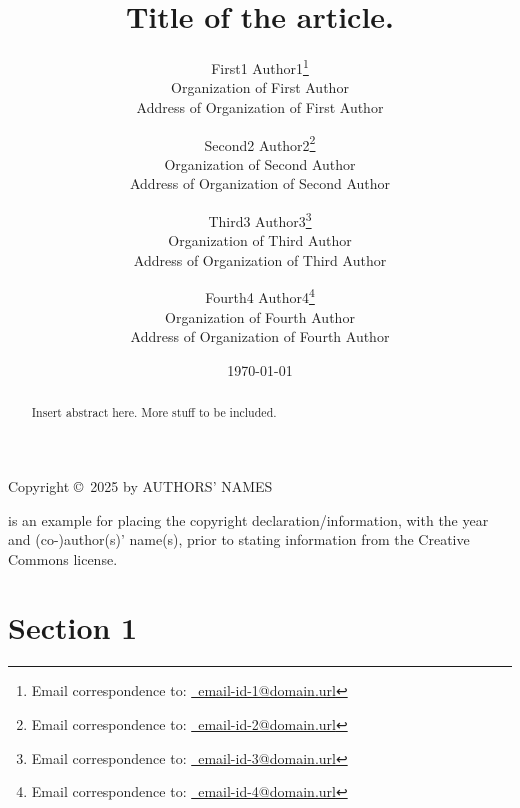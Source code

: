 \documentclass[letter,12pt]{article}
\begin{document}
\title{Title of the article.}
\date{\today}
\author{
	First1 Author1\thanks{Email correspondence to: \href{mailto:email-id-1@domain.url}{\Email\ email-id-1@domain.url}} \\
		Organization of First Author\\
		Address of Organization of First Author
	\and
	Second2 Author2\thanks{Email correspondence to: \href{mailto:email-id-2@domain.url}{\Email\ email-id-2@domain.url}} \\
		Organization of Second Author\\
		Address of Organization of Second Author
	\and
	Third3 Author3\thanks{Email correspondence to: \href{mailto:email-id-3@domain.url}{\Email\ email-id-3@domain.url}} \\
		Organization of Third Author\\
		Address of Organization of Third Author
	\and
	Fourth4 Author4\thanks{Email correspondence to: \href{mailto:email-id-4@domain.url}{\Email\ email-id-4@domain.url}} \\
		Organization of Fourth Author\\
		Address of Organization of Fourth Author
}
\maketitle


\begin{center} 
Copyright \copyright\ 2025 by AUTHORS' NAMES
\end{center}
\doclicenseThis

\cite{Sutton2018} is an example for placing the copyright declaration/information, with the year and (co-)author(s)' name(s), prior to stating information from the Creative Commons license.

\begin{abstract} 
Insert abstract here. More stuff to be included.
\end{abstract}





\section{Section 1}
\label{sec:mysection1}
\end{document}
